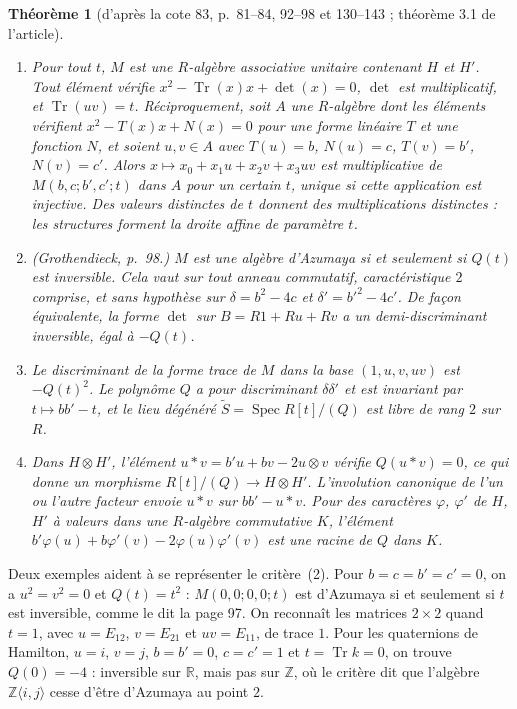 \documentclass[11pt,a4paper]{amsart}
\theoremstyle{definition}
\theoremstyle{plain}
\newtheorem{theoreme}{Théorème}
\theoremstyle{remark}
\theoremstyle{plain}
\newcommand{\Z}{\mathbb Z}
\newcommand{\Tr}{\operatorname{Tr}}
\newcommand{\Spec}{\operatorname{Spec}}
\begin{document}
\begin{theoreme}[d'après la cote 83, p.~81--84, 92--98 et 130--143 ; théorème 3.1 de l'article]
\leavevmode
\begin{enumerate}
\item Pour tout $t$, $M$ est une $R$-algèbre associative unitaire contenant $H$ et $H'$. Tout élément vérifie $x^2 - \Tr(x)x + \det(x) = 0$, $\det$ est multiplicatif, et $\Tr(uv) = t$. Réciproquement, soit $A$ une $R$-algèbre dont les éléments vérifient $x^2 - T(x)x + N(x) = 0$ pour une forme linéaire $T$ et une fonction $N$, et soient $u, v \in A$ avec $T(u) = b$, $N(u) = c$, $T(v) = b'$, $N(v) = c'$. Alors $x \mapsto x_0 + x_1u + x_2v + x_3uv$ est multiplicative de $M(b, c; b', c'; t)$ dans $A$ pour un certain $t$, unique si cette application est injective. Des valeurs distinctes de $t$ donnent des multiplications distinctes : les structures forment la droite affine de paramètre $t$.
\item \emph{(Grothendieck, p.~98.)} $M$ est une algèbre d'Azumaya si et seulement si $Q(t)$ est inversible. Cela vaut sur tout anneau commutatif, caractéristique $2$ comprise, et sans hypothèse sur $\delta = b^2 - 4c$ et $\delta' = b'^2 - 4c'$. De façon équivalente, la forme $\det$ sur $B = R1 + Ru + Rv$ a un demi-discriminant inversible, égal à $-Q(t)$.
\item Le discriminant de la forme trace de $M$ dans la base $(1, u, v, uv)$ est $-Q(t)^2$. Le polynôme $Q$ a pour discriminant $\delta\delta'$ et est invariant par $t \mapsto bb' - t$, et le lieu dégénéré $\widetilde S = \Spec R[t]/(Q)$ est libre de rang $2$ sur $R$.
\item Dans $H\otimes H'$, l'élément $u * v = b'u + bv - 2u\otimes v$ vérifie $Q(u * v) = 0$, ce qui donne un morphisme $R[t]/(Q) \to H\otimes H'$. L'involution canonique de l'un ou l'autre facteur envoie $u * v$ sur $bb' - u * v$. Pour des caractères $\varphi$, $\varphi'$ de $H$, $H'$ à valeurs dans une $R$-algèbre commutative $K$, l'élément $b'\varphi(u) + b\varphi'(v) - 2\varphi(u)\varphi'(v)$ est une racine de $Q$ dans $K$.
\end{enumerate}
\end{theoreme}

Deux exemples aident à se représenter le critère~(2). Pour $b = c = b' = c' = 0$, on a $u^2 = v^2 = 0$ et $Q(t) = t^2$ : $M(0, 0; 0, 0; t)$ est d'Azumaya si et seulement si $t$ est inversible, comme le dit la page 97. On reconnaît les matrices $2\times 2$ quand $t = 1$, avec $u = E_{12}$, $v = E_{21}$ et $uv = E_{11}$, de trace $1$. Pour les quaternions de Hamilton, $u = i$, $v = j$, $b = b' = 0$, $c = c' = 1$ et $t = \Tr k = 0$, on trouve $Q(0) = -4$ : inversible sur $\mathbb R$, mais pas sur $\Z$, où le critère dit que l'algèbre $\Z\langle i, j\rangle$ cesse d'être d'Azumaya au point $2$.
\end{document}
